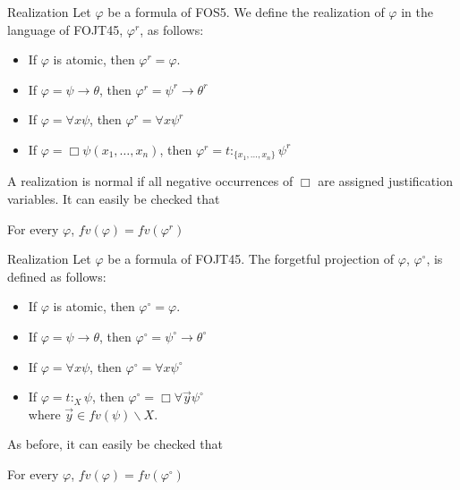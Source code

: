 \documentclass{beamer}
\theoremstyle{definition}
\newcommand{\impli}{\rightarrow}
\newcommand{\todo}{\forall}
\begin{document}
\begin{frame}{Realization}
\qquad Let $\varphi$ be a formula of FOS5. We define the {\color{blue}realization} of $\varphi$ in the language of FOJT45, $\varphi^{r}$, as follows:


\begin{itemize}
\item If $\varphi$ is atomic, then $\varphi^{r} = \varphi$.
\item If $\varphi = \psi\impli\theta$, then $\varphi^{r} = \psi^{r}\impli\theta^{r}$
\item If $\varphi = \todo x \psi$, then $\varphi^{r} = \todo x \psi^{r}$
\item If $\varphi = \Box \psi (x_{1}, \dots, x_{n})$, then $\varphi^{r} =t$$:_{\{x_{1}, \dots, x_{n}\}}$$ \psi^{r}$
\end{itemize}

\qquad A realization is normal if all negative occurrences of $\Box$ are assigned justification variables. It can easily be checked that

\begin{center}
For every $\varphi$, $fv(\varphi) = fv(\varphi^{r})$
\end{center}
\end{frame}



\begin{frame}{Realization}
\qquad Let $\varphi$ be a formula of FOJT45. {\color{blue}The forgetful projection} of $\varphi$, $\varphi^{\circ}$, is defined as follows:


\begin{itemize}
\item If $\varphi$ is atomic, then $\varphi^{\circ} = \varphi$.
\item If $\varphi = \psi\impli\theta$, then $\varphi^{\circ} = \psi^{\circ}\impli\theta^{\circ}$
\item If $\varphi = \todo x \psi$, then $\varphi^{\circ} = \todo x \psi^{\circ}$
\item If $\varphi = t$$:_{X}$$ \psi$, then $\varphi^{\circ} = \Box \todo \vec{y}\psi^{\circ}$\\ where $\vec{y} \in fv(\psi)\backslash X$.
\end{itemize}

\qquad As before, it can easily be checked that

\begin{center}
	For every $\varphi$, $fv(\varphi) = fv(\varphi^{\circ})$
\end{center}	
\end{frame}
\end{document}
